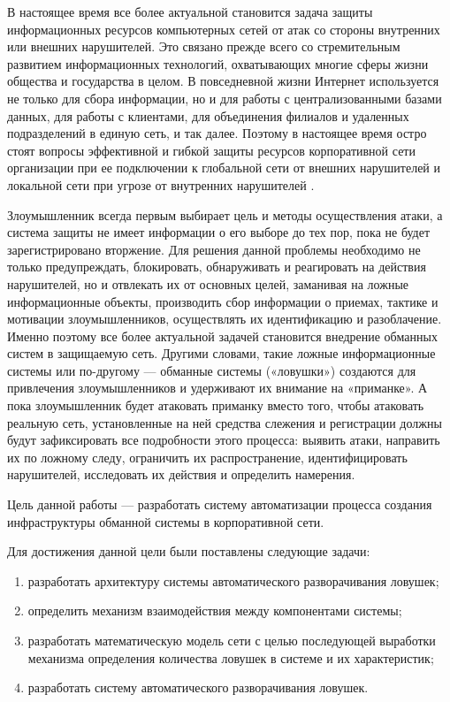 
В настоящее время все более актуальной становится задача защиты информационных ресурсов компьютерных сетей от атак со стороны внутренних или внешних нарушителей. Это связано прежде всего со стремительным развитием информационных технологий, охватывающих многие сферы жизни общества и государства в целом. В повседневной жизни Интернет используется не только для сбора информации, но и для работы с централизованными базами данных, для работы с клиентами, для объединения филиалов и удаленных подразделений в единую сеть, и так далее. Поэтому в настоящее время остро стоят вопросы  эффективной и гибкой защиты ресурсов корпоративной сети организации при ее подключении к глобальной сети от внешних нарушителей и локальной сети при угрозе от внутренних нарушителей \citep{emelyanova_fralenko}.

Злоумышленник всегда первым выбирает цель и методы осуществления атаки, а система защиты не имеет информации о его выборе до тех пор, пока не будет зарегистрировано вторжение. Для решения данной проблемы необходимо не только предупреждать, блокировать, обнаруживать и реагировать на действия нарушителей, но и отвлекать их от основных целей, заманивая на ложные информационные объекты, производить сбор информации о приемах, тактике и мотивации злоумышленников, осуществлять их идентификацию и разоблачение. Именно поэтому все более актуальной задачей становится внедрение обманных систем в защищаемую сеть. Другими словами, такие ложные информационные системы или по-другому — обманные системы («ловушки») создаются для привлечения злоумышленников и удерживают их внимание на «приманке». А пока злоумышленник будет атаковать приманку вместо того, чтобы атаковать реальную сеть, установленные на ней средства слежения и регистрации должны будут зафиксировать все подробности этого процесса:  выявить атаки, направить их по ложному следу, ограничить их распространение, идентифицировать нарушителей, исследовать их действия и определить намерения.

Цель данной работы — разработать систему автоматизации процесса создания инфраструктуры обманной системы в корпоративной сети.

Для достижения данной цели были поставлены следующие задачи: 

\begin{enumerate}
	\item разработать архитектуру системы автоматического разворачивания ловушек;
	\item определить механизм взаимодействия между компонентами системы;
	\item разработать математическую модель сети с целью последующей выработки механизма определения количества ловушек в системе и их характеристик;
	\item разработать систему автоматического разворачивания ловушек.
\end{enumerate}